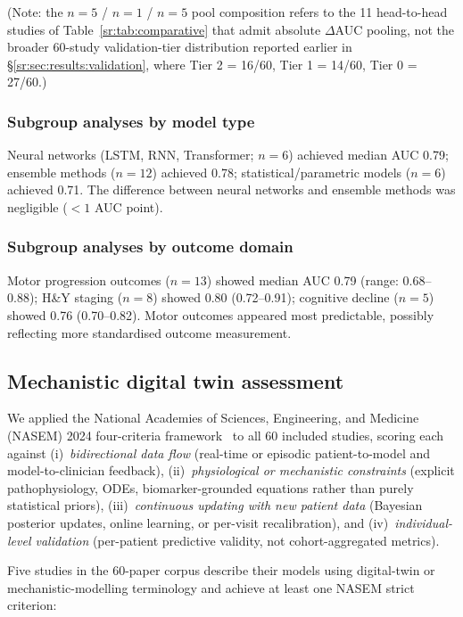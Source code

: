 \noindent (Note: the $n=5$ / $n=1$ / $n=5$ pool composition refers to the 11 head-to-head studies of Table~\ref{sr:tab:comparative} that admit absolute $\Delta$AUC pooling, not the broader 60-study validation-tier distribution reported earlier in \S\ref{sr:sec:results:validation}, where Tier 2 = 16/60, Tier 1 = 14/60, Tier 0 = 27/60.)

\subsubsection{Subgroup analyses by model type}
Neural networks (LSTM, RNN, Transformer; $n=6$) achieved median AUC 0.79; ensemble methods ($n=12$) achieved 0.78; statistical/parametric models ($n=6$) achieved 0.71. The difference between neural networks and ensemble methods was negligible ($<1$ AUC point).

\subsubsection{Subgroup analyses by outcome domain}
Motor progression outcomes ($n=13$) showed median AUC 0.79 (range: 0.68--0.88); H\&Y staging ($n=8$) showed 0.80 (0.72--0.91); cognitive decline ($n=5$) showed 0.76 (0.70--0.82). Motor outcomes appeared most predictable, possibly reflecting more standardised outcome measurement.

\subsection{Mechanistic digital twin assessment}
\label{sr:sec:dt}

We applied the National Academies of Sciences, Engineering, and Medicine (NASEM) 2024 four-criteria framework~\cite{nasem2024} to all 60 included studies, scoring each against (i)~\emph{bidirectional data flow} (real-time or episodic patient-to-model and model-to-clinician feedback), (ii)~\emph{physiological or mechanistic constraints} (explicit pathophysiology, ODEs, biomarker-grounded equations rather than purely statistical priors), (iii)~\emph{continuous updating with new patient data} (Bayesian posterior updates, online learning, or per-visit recalibration), and (iv)~\emph{individual-level validation} (per-patient predictive validity, not cohort-aggregated metrics).

Five studies in the 60-paper corpus describe their models using digital-twin or mechanistic-modelling terminology and achieve at least one NASEM strict criterion:

